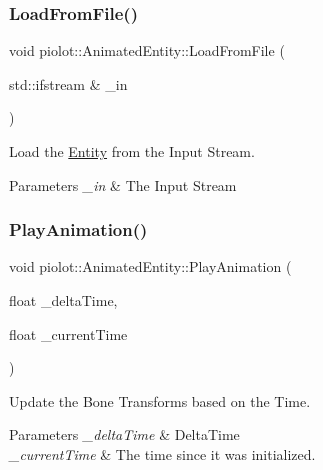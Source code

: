 \subsubsection{\texorpdfstring{Load\+From\+File()}{LoadFromFile()}}
{\footnotesize\ttfamily void piolot\+::\+Animated\+Entity\+::\+Load\+From\+File (\begin{DoxyParamCaption}\item[{std\+::ifstream \&}]{\+\_\+in }\end{DoxyParamCaption})}



Load the \mbox{\hyperlink{classpiolot_1_1_entity}{Entity}} from the Input Stream. 


\begin{DoxyParams}{Parameters}
{\em \+\_\+in} & The Input Stream \\
\hline
\end{DoxyParams}
\mbox{\label{classpiolot_1_1_animated_entity_ac136308002d8df68468bf489aa1a584c}} 
\subsubsection{\texorpdfstring{Play\+Animation()}{PlayAnimation()}}
{\footnotesize\ttfamily void piolot\+::\+Animated\+Entity\+::\+Play\+Animation (\begin{DoxyParamCaption}\item[{float}]{\+\_\+delta\+Time,  }\item[{float}]{\+\_\+current\+Time }\end{DoxyParamCaption})}



Update the Bone Transforms based on the Time. 


\begin{DoxyParams}{Parameters}
{\em \+\_\+delta\+Time} & Delta\+Time \\
\hline
{\em \+\_\+current\+Time} & The time since it was initialized. \\
\hline
\end{DoxyParams}
\mbox{\label{classpiolot_1_1_animated_entity_a087000fec2d12db05ca9e07676318ed2}} 
